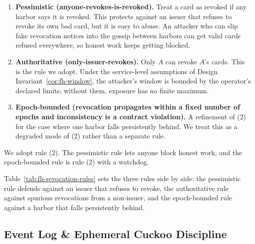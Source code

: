 \documentclass[11pt,a4paper]{article}
\theoremstyle{definition}
\theoremstyle{remark}
\begin{document}
\begin{enumerate}[nosep]
\item \textbf{Pessimistic (anyone-revokes-is-revoked).} Treat a card as revoked if any harbor says it is revoked. This protects against an issuer that refuses to revoke its own bad card, but it is easy to abuse. An attacker who can slip fake revocation notices into the gossip between harbors can get valid cards refused everywhere, so honest work keeps getting blocked.
\item \textbf{Authoritative (only-issuer-revokes).} Only $A$ can revoke $A$'s cards. This is the rule we adopt. Under the service-level assumptions of Design Invariant~\ref{cor:fh-window}, the attacker's window is bounded by the operator's declared limits; without them, exposure has no finite maximum.
\item \textbf{Epoch-bounded (revocation propagates within a fixed number of epochs and inconsistency is a contract violation).} A refinement of (2) for the case where one harbor falls persistently behind. We treat this as a degraded mode of (2) rather than a separate rule.
\end{enumerate}

We adopt rule (2). The pessimistic rule lets anyone block honest work, and
the epoch-bounded rule is rule (2) with a watchdog.

Table~\ref{tab:fh-revocation-rules} sets the three rules side by side: the pessimistic rule defends against an issuer that refuses to revoke, the authoritative rule against spurious revocations from a non-issuer, and the epoch-bounded rule against a harbor that falls persistently behind.



\pdexercisepointerone{\ref{ex:fh-revocation-finality}}{\pageref{ex:fh-revocation-finality}}

\subsection{Event Log \& Ephemeral Cuckoo Discipline}\label{sec:fh-cuckoo}
\end{document}
